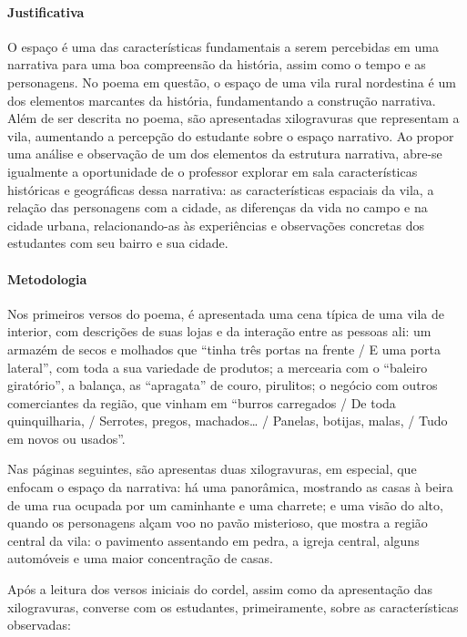 \documentclass[11pt]{extarticle}
\begin{document}
\paragraph{Justificativa} O espaço é uma das características fundamentais a serem percebidas em uma narrativa para uma boa compreensão da história, assim como o tempo e as personagens. No poema em questão, o espaço de uma vila rural nordestina é um dos elementos marcantes da história, fundamentando a construção narrativa. Além de ser descrita no poema, são apresentadas xilogravuras que representam a vila, aumentando a percepção do estudante sobre o espaço narrativo. Ao propor uma análise e observação de um dos elementos da estrutura narrativa, abre-se igualmente a oportunidade de o professor explorar em sala características históricas e geográficas dessa narrativa: as características espaciais da vila, a relação das personagens com a cidade, as diferenças da vida no campo e na cidade urbana, relacionando-as às experiências e observações concretas dos estudantes com seu bairro e sua cidade.

\paragraph{Metodologia} Nos primeiros versos do poema, é apresentada uma cena típica de uma vila de interior, com descrições de suas lojas e da interação entre as pessoas ali: um armazém de secos e molhados que ``tinha três portas na frente / E uma porta lateral'', com toda a sua variedade de produtos; a mercearia com o ``baleiro giratório'', a balança, as ``apragata'' de couro, pirulitos; o negócio com outros comerciantes da região, que vinham em ``burros carregados / De toda quinquilharia, / Serrotes, pregos, machados\ldots{} / 
Panelas, botijas, malas, / Tudo em novos ou usados''.

Nas páginas seguintes, são apresentas duas xilogravuras, em especial, que enfocam o espaço da narrativa: há uma panorâmica, mostrando as casas à beira de uma rua ocupada por um caminhante e uma charrete; e uma visão do alto, quando os personagens alçam voo no pavão misterioso, que mostra a região central da vila: o pavimento assentando em pedra, a igreja central, alguns automóveis e uma maior concentração de casas.

Após a leitura dos versos iniciais do cordel, assim como da apresentação das xilogravuras, converse com os estudantes, primeiramente, sobre as características observadas:
\end{document}
